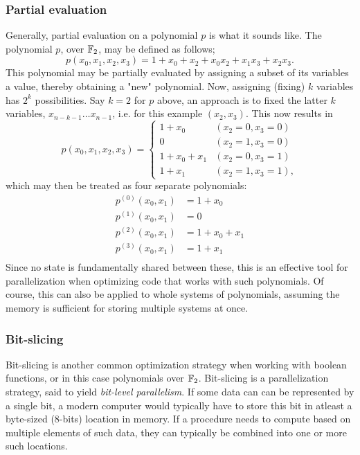 \subsubsection{Partial evaluation}
Generally, partial evaluation on a polynomial $p$ is what it sounds like. The polynomial $p$, over $\mathbb{F}_2$, may be defined as follows;
$$
    p(x_0, x_1, x_2, x_3) = 1 + x_0 + x_2 + x_0x_2 + x_1x_3 + x_2x_3.
$$
This polynomial may be partially evaluated by assigning a subset of its variables a value, thereby obtaining a "new" polynomial. Now, assigning (fixing) $k$ variables has $2^k$ possibilities. Say $k = 2$ for $p$ above, an approach is to fixed the latter $k$ variables, $x_{n - k - 1} \dots x_{n - 1}$, i.e. for this example $(x_2,x_3)$. This now results in 
\begin{equation}
    p(x_0,x_1,x_2,x_3) = 
    \begin{cases}
        1 + x_0       & (x_2 = 0, x_3 = 0)\\
        0             & (x_2 = 1, x_3 = 0)\\
        1 + x_0 + x_1 & (x_2 = 0, x_3 = 1)\\
        1 + x_1       & (x_2 = 1, x_3 = 1),
    \end{cases}
\end{equation} 
which may then be treated as four separate polynomials:
\begin{equation}
    \begin{split}
        p^{(0)}(x_0, x_1) &= 1 + x_0          \\
        p^{(1)}(x_0, x_1) &= 0                \\           
        p^{(2)}(x_0, x_1) &= 1 + x_0 + x_1    \\
        p^{(3)}(x_0, x_1) &= 1 + x_1          \\
    \end{split}
\end{equation}
Since no state is fundamentally shared between these, this is an effective tool for parallelization when optimizing code that works with such polynomials. Of course, this can also be applied to whole systems of polynomials, assuming the memory is sufficient for storing multiple systems at once.

\subsubsection{Bit-slicing}
Bit-slicing is another common optimization strategy when working with boolean functions, or in this case polynomials over $\mathbb{F}_2$. Bit-slicing is a parallelization strategy, said to yield \textit{bit-level parallelism}. If some data can can be represented by a single bit, a modern computer would typically have to store this bit in atleast a byte-sized (8-bits) location in memory. If a procedure needs to compute based on multiple elements of such data, they can typically be combined into one or more such locations.

